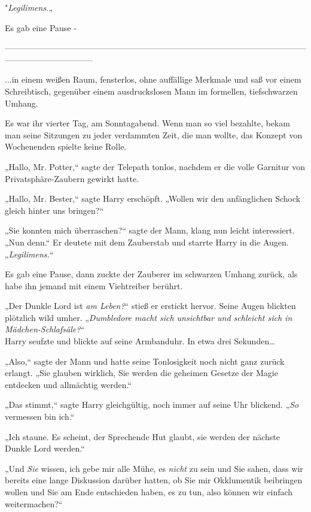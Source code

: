 {"\emph{Legilimens.}„

Es gab eine Pause -

--------------------------------------------------------------------------------------------------------------------------------------------

\hfill\break ...in einem weißen Raum, fensterlos, ohne auffällige Merkmale und saß vor einem Schreibtisch, gegenüber einem ausdruckslosen Mann im formellen, tiefschwarzen Umhang.

Es war ihr vierter Tag, am Sonntagabend. Wenn man so viel bezahlte, bekam man seine Sitzungen zu jeder verdammten Zeit, die man wollte, das Konzept von Wochenenden spielte keine Rolle.

„Hallo, Mr. Potter,“ sagte der Telepath tonlos, nachdem er die volle Garnitur von Privatsphäre-Zaubern gewirkt hatte.

„Hallo, Mr. Bester,“ sagte Harry erschöpft. „Wollen wir den anfänglichen Schock gleich hinter uns bringen?“

„Sie konnten mich überraschen?“ sagte der Mann, klang nun leicht interessiert. „Nun denn.“ Er deutete mit dem Zauberstab und starrte Harry in die Augen. „\emph{Legilimens.}“

Es gab eine Pause, dann zuckte der Zauberer im schwarzen Umhang zurück, als habe ihn jemand mit einem Viehtreiber berührt.

„Der Dunkle Lord ist \emph{am Leben?}“ stieß er erstickt hervor. Seine Augen blickten plötzlich wild umher. „\emph{Dumbledore macht sich unsichtbar und schleicht sich in Mädchen-Schlafsäle?}“\\ Harry seufzte und blickte auf seine Armbanduhr. In etwa drei Sekunden…

„Also,“ sagte der Mann und hatte seine Tonlosigkeit noch nicht ganz zurück erlangt. „Sie glauben wirklich, Sie werden die geheimen Gesetze der Magie entdecken und allmächtig werden.“

„Das stimmt,“ sagte Harry gleichgültig, noch immer auf seine Uhr blickend. „\emph{So} vermessen bin ich.“

„Ich staune. Es scheint, der Sprechende Hut glaubt, sie werden der nächste Dunkle Lord werden.“

„Und \emph{Sie} wissen, ich gebe mir alle Mühe, es \emph{nicht} zu sein und Sie sahen, dass wir bereits eine lange Diskussion darüber hatten, ob Sie mir Okklumentik beibringen wollen und Sie am Ende entschieden haben, es zu tun, also können wir einfach weitermachen?“

}
